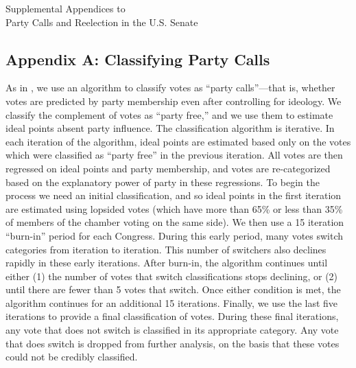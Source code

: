 \documentclass[12pt]{article}
\begin{document}
\doublespacing

\setcounter{table}{0}
\setcounter{footnote}{0}
\setcounter{figure}{0}
\setcounter{page}{0}


\begin{center}
\vspace*{1in}
{\Large Supplemental Appendices to\\}
{\LARGE Party Calls and Reelection in the U.S. Senate}
\end{center}
\vspace*{1in}

\thispagestyle{empty}

\setcounter{tocdepth}{1}
\setcounter{secnumdepth}{0}
\tableofcontents

\renewcommand\thetable{A\arabic{table}}
\renewcommand\thepage{A\arabic{page}}

\clearpage

\subsection*{Appendix A: Classifying Party Calls}
%

As in \cite{Minozzi:2013}, we use an algorithm to classify votes as ``party calls''---that is, whether votes are predicted by party membership even after controlling for ideology.  We classify the complement of votes as ``party free,'' and we use them to estimate ideal points absent party influence.  The classification algorithm is iterative.  In each iteration of the algorithm, ideal points are estimated based only on the votes which were classified as ``party free'' in the previous iteration.  All votes are then regressed on ideal points and party membership, and votes are re-categorized based on the explanatory power of party in these regressions.  To begin the process we need an initial classification, and so ideal points in the first iteration are estimated using lopsided votes (which have more than 65\% or less than 35\% of members of the chamber voting on the same side).  We then use a 15 iteration ``burn-in'' period for each Congress.  During this early period, many votes switch categories from iteration to iteration.  This number of switchers also declines rapidly in these early iterations.  After burn-in, the algorithm continues until either (1) the number of votes that switch classifications stops declining, or (2) until there are fewer than 5 votes that switch.  Once either condition is met, the algorithm continues for an additional 15 iterations.  Finally, we use the last five iterations to provide a final classification of votes. During these final iterations, any vote that does not switch is classified in its appropriate category.  Any vote that does switch is dropped from further analysis, on the basis that these votes could not be credibly classified.
\end{document}
